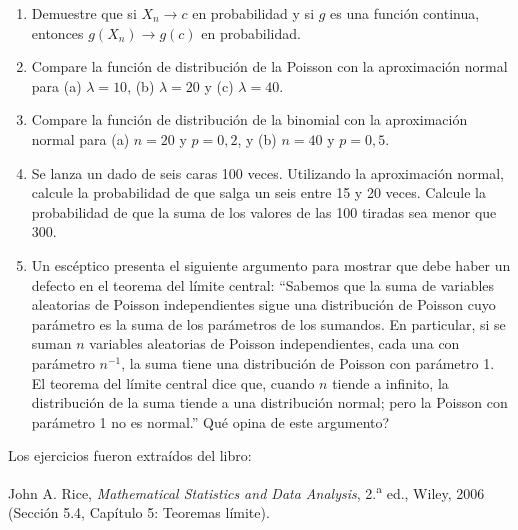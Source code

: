 \documentclass[12pt]{article}
\newcommand{\invq}{\mbox{\reflectbox{?}}}
\begin{document}
\begin{enumerate}
\item Demuestre que si $X_n\to c$ en probabilidad y si $g$ es una funci\'on continua, entonces $g(X_n)\to g(c)$ en probabilidad.

\item Compare la funci\'on de distribuci\'on de la Poisson con la aproximaci\'on normal para (a) $\lambda=10$, (b) $\lambda=20$ y (c) $\lambda=40$.

\item Compare la funci\'on de distribuci\'on de la binomial con la aproximaci\'on normal para (a) $n=20$ y $p=0{,}2$, y (b) $n=40$ y $p=0{,}5$.

\item Se lanza un dado de seis caras 100 veces. Utilizando la aproximaci\'on normal, calcule la probabilidad de que salga un seis entre 15 y 20 veces. Calcule la probabilidad de que la suma de los valores de las 100 tiradas sea menor que 300.

\item Un esc\'eptico presenta el siguiente argumento para mostrar que debe haber un defecto en el teorema del l\'imite central: ``Sabemos que la suma de variables aleatorias de Poisson independientes sigue una distribuci\'on de Poisson cuyo par\'ametro es la suma de los par\'ametros de los sumandos. En particular, si se suman $n$ variables aleatorias de Poisson independientes, cada una con par\'ametro $n^{-1}$, la suma tiene una distribuci\'on de Poisson con par\'ametro 1. El teorema del l\'imite central dice que, cuando $n$ tiende a infinito, la distribuci\'on de la suma tiende a una distribuci\'on normal; pero la Poisson con par\'ametro 1 no es normal.'' \invq Qu\'e opina de este argumento?

\end{enumerate}

\vspace{2em}

{\small Los ejercicios fueron extra\'idos del libro:}
\medskip

{\small
John A. Rice, \emph{Mathematical Statistics and Data Analysis}, 2.\textsuperscript{a} ed., Wiley, 2006 (Secci\'on 5.4, Cap\'itulo 5: Teoremas l\'imite).
}
\end{document}

